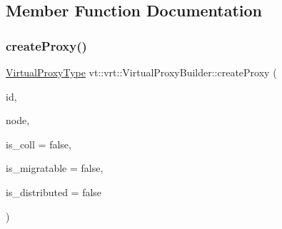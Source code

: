 \subsection{Member Function Documentation}
\mbox{\label{structvt_1_1vrt_1_1_virtual_proxy_builder_ada5085518120bf7605a4fbf60863f037}} 
\subsubsection{\texorpdfstring{create\+Proxy()}{createProxy()}}
{\footnotesize\ttfamily \hyperlink{namespacevt_a1b417dd5d684f045bb58a0ede70045ac}{Virtual\+Proxy\+Type} vt\+::vrt\+::\+Virtual\+Proxy\+Builder\+::create\+Proxy (\begin{DoxyParamCaption}\item[{\hyperlink{namespacevt_1_1vrt_a84d0891f52f70728c3fc2172cffb464b}{Virtual\+I\+D\+Type} const \&}]{id,  }\item[{\hyperlink{namespacevt_a866da9d0efc19c0a1ce79e9e492f47e2}{Node\+Type} const \&}]{node,  }\item[{bool const \&}]{is\+\_\+coll = {\ttfamily false},  }\item[{bool const \&}]{is\+\_\+migratable = {\ttfamily false},  }\item[{bool const \&}]{is\+\_\+distributed = {\ttfamily false} }\end{DoxyParamCaption})\hspace{0.3cm}{\ttfamily [static]}}

\mbox{\label{structvt_1_1vrt_1_1_virtual_proxy_builder_a148a3a90992f5f6bbfaa41631eded0a9}} 
